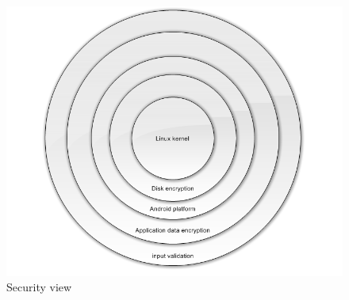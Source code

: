 \begin{figure}[H]
	\includegraphics[width=\textwidth]{securityview.png}
	\caption{Security view}
	\label{fig:securityview}
\end{figure} \hfill
\newline
\newline

\pagebreak 

